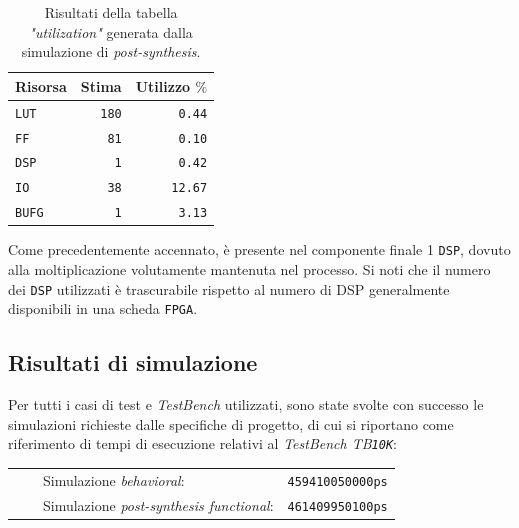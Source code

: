 \documentclass{article}
\newcommand{\tabitem}{~~\llap{\textbullet}~~}
\begin{document}
\begin{table}[ht]
    \centering
    \small
    \def\arraystretch{1.3} %
    \caption{Risultati della tabella \emph{"utilization"} generata dalla simulazione di \emph{post-synthesis}.}
    \begin{tabular}[width=4cm]{|| l | r | r ||}
        \hline
        Risorsa & Stima & Utilizzo $\%$\footnotemark  \\ 
        \hline \hline
        \texttt{LUT}     & \texttt{180} & \texttt{0.44}     \\ \hline
        \texttt{FF}      & \texttt{81}  & \texttt{0.10}     \\ \hline
        \texttt{DSP}     & \texttt{1}   & \texttt{0.42}     \\ \hline
        \texttt{IO}      & \texttt{38}  & \texttt{12.67}    \\ \hline
        \texttt{BUFG}    & \texttt{1}   & \texttt{3.13}     \\ \hline
    \end{tabular}
\end{table}
\vspace{0,2cm}

Come precedentemente accennato, è presente nel componente finale 1 \texttt{DSP}, dovuto alla moltiplicazione volutamente mantenuta nel processo. Si noti che il numero dei \texttt{DSP} utilizzati è trascurabile rispetto al numero di DSP generalmente disponibili in una scheda \texttt{FPGA}. 
\vspace{0,2cm}

\subsection{Risultati di simulazione}
Per tutti i casi di test e \emph{TestBench} utilizzati, sono state svolte con successo le simulazioni richieste dalle specifiche di progetto, di cui si riportano come riferimento di tempi di esecuzione relativi al \emph{TestBench TB\texttt{10K}}:\par
\def\arraystretch{1.3} %
\begin{tabular}{m{8cm} m{3cm}}
    \tabitem Simulazione \emph{behavioral}:                 & \texttt{459410050000ps}  \\  
    \tabitem Simulazione \emph{post-synthesis functional}:  & \texttt{461409950100ps}  \\  
\end{tabular}\vspace{0,2cm}
\end{document}
